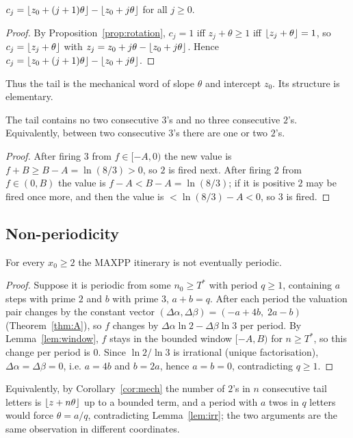 \begin{corollary}\label{cor:mech}
$c_j=\lfloor z_0+(j+1)\theta\rfloor-\lfloor z_0+j\theta\rfloor$ for all $j\ge0$.
\end{corollary}
\begin{proof} By Proposition~\ref{prop:rotation}, $c_j=1$ iff $z_j+\theta\ge1$ iff $\lfloor z_j+\theta\rfloor=1$, so $c_j=\lfloor z_j+\theta\rfloor$ with $z_j=z_0+j\theta-\lfloor z_0+j\theta\rfloor$. Hence $c_j=\lfloor z_0+(j+1)\theta\rfloor-\lfloor z_0+j\theta\rfloor$. \end{proof}
Thus the tail is the mechanical word of slope $\theta$ and intercept $z_0$. Its structure is elementary.
\begin{proposition}[Blocks]\label{prop:blocks}
The tail contains no two consecutive $3$'s and no three consecutive $2$'s. Equivalently, between two consecutive $3$'s there are one or two $2$'s.
\end{proposition}
\begin{proof}
After firing $3$ from $f\in[-A,0)$ the new value is $f+B\ge B-A=\ln(8/3)>0$, so $2$ is fired next. After firing $2$ from $f\in(0,B)$ the value is $f-A<B-A=\ln(8/3)$; if it is positive $2$ may be fired once more, and then the value is $<\ln(8/3)-A<0$, so $3$ is fired. \end{proof}

\subsection{Non-periodicity}
\begin{theorem}\label{thm:nonper}
For every $x_0\ge2$ the \textsf{MAXPP} itinerary is not eventually periodic.
\end{theorem}
\begin{proof}
Suppose it is periodic from some $n_0\ge T^*$ with period $q\ge1$, containing $a$ steps with prime $2$ and $b$ with prime $3$, $a+b=q$. After each period the valuation pair changes by the constant vector $(\Delta\alpha,\Delta\beta)=(-a+4b,\;2a-b)$ (Theorem~\ref{thm:A}), so $f$ changes by $\Delta\alpha\ln2-\Delta\beta\ln3$ per period. By Lemma~\ref{lem:window}, $f$ stays in the bounded window $[-A,B)$ for $n\ge T^*$, so this change per period is $0$. Since $\ln2/\ln3$ is irrational (unique factorisation), $\Delta\alpha=\Delta\beta=0$, i.e. $a=4b$ and $b=2a$, hence $a=b=0$, contradicting $q\ge1$. \end{proof}
\begin{remark}
Equivalently, by Corollary~\ref{cor:mech} the number of $2$'s in $n$ consecutive tail letters is $\lfloor z+n\theta\rfloor$ up to a bounded term, and a period with $a$ twos in $q$ letters would force $\theta=a/q$, contradicting Lemma~\ref{lem:irr}; the two arguments are the same observation in different coordinates.
\end{remark}

